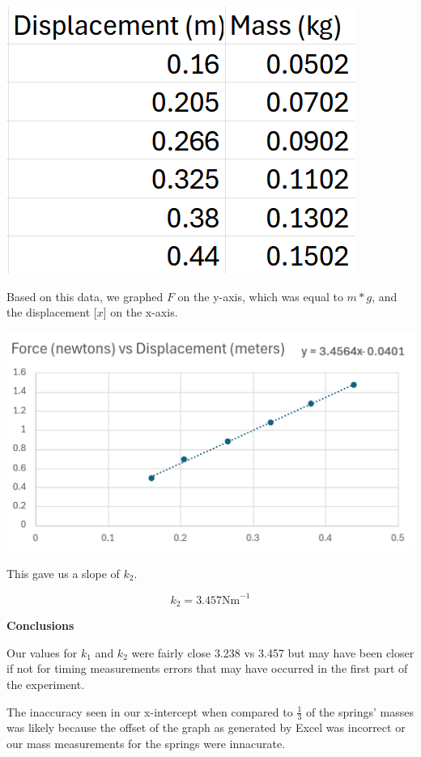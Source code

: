 \documentclass[12pt]{article}
\begin{document}
\vspace{1em}
\begin{center}
    \includegraphics[scale=0.4]{table_12_2.png}
\end{center}
\vspace{1em}


Based on this data, we graphed $F$ on the y-axis, which was equal to $m * g$, and the displacement [$x$] on the x-axis.

\vspace{1em}
\begin{center}
    \includegraphics[scale=0.5]{graph_12_2.png}
\end{center}
\vspace{1em}

This gave us a slope of $k_2$.

\[ k_2 = 3.457 \text{Nm}^{-1} \]


\newpage

\textbf{Conclusions}\vspace{1em}

Our values for $k_1$ and $k_2$ were fairly close 3.238 vs 3.457 but may have been closer
if not for timing measurements errors that may have occurred in the first part of the
experiment.

\vspace{1em}

The inaccuracy seen in our x-intercept when compared to $\frac{1}{3}$ of the springs' masses
was likely because the offset of the graph as generated by Excel was incorrect or our mass measurements
for the springs were innacurate.
\end{document}
